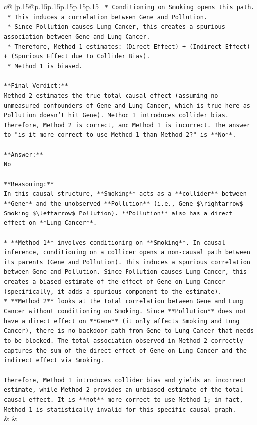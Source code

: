 \documentclass{article}
\begin{document}
{\begin{supertabular}{c@{$\;$}|p{.15\linewidth}@{}p{.15\linewidth}p{.15\linewidth}p{.15\linewidth}p{.15\linewidth}p{.15\linewidth}}
{{{\texttt{    *   Conditioning on Smoking opens this path.} \\
\texttt{    *   This induces a correlation between Gene and Pollution.} \\
\texttt{    *   Since Pollution causes Lung Cancer, this creates a spurious association between Gene and Lung Cancer.} \\
\texttt{    *   Therefore, Method 1 estimates: (Direct Effect) + (Indirect Effect) + (Spurious Effect due to Collider Bias).} \\
\texttt{    *   Method 1 is biased.} \\
\\ 
\texttt{**Final Verdict:**} \\
\texttt{Method 2 estimates the true total causal effect (assuming no unmeasured confounders of Gene and Lung Cancer, which is true here as Pollution doesn't hit Gene). Method 1 introduces collider bias. Therefore, Method 2 is correct, and Method 1 is incorrect. The answer to "is it more correct to use Method 1 than Method 2?" is **No**.} \\
\\ 
\texttt{**Answer:**} \\
\texttt{No} \\
\\ 
\texttt{**Reasoning:**} \\
\texttt{In this causal structure, **Smoking** acts as a **collider** between **Gene** and the unobserved **Pollution** (i.e., Gene \$\textbackslash{}rightarrow\$ Smoking \$\textbackslash{}leftarrow\$ Pollution). **Pollution** also has a direct effect on **Lung Cancer**.} \\
\\ 
\texttt{*   **Method 1** involves conditioning on **Smoking**. In causal inference, conditioning on a collider opens a non{-}causal path between its parents (Gene and Pollution). This induces a spurious correlation between Gene and Pollution. Since Pollution causes Lung Cancer, this creates a biased estimate of the effect of Gene on Lung Cancer (specifically, it adds a spurious component to the estimate).} \\
\texttt{*   **Method 2** looks at the total correlation between Gene and Lung Cancer without conditioning on Smoking. Since **Pollution** does not have a direct effect on **Gene** (it only affects Smoking and Lung Cancer), there is no backdoor path from Gene to Lung Cancer that needs to be blocked. The total association observed in Method 2 correctly captures the sum of the direct effect of Gene on Lung Cancer and the indirect effect via Smoking.} \\
\\ 
\texttt{Therefore, Method 1 introduces collider bias and yields an incorrect estimate, while Method 2 provides an unbiased estimate of the total causal effect. It is **not** more correct to use Method 1; in fact, Method 1 is statistically invalid for this specific causal graph.} \\
            }
        }
    }
    & & \\ \\


\end{supertabular}}
\end{document}
